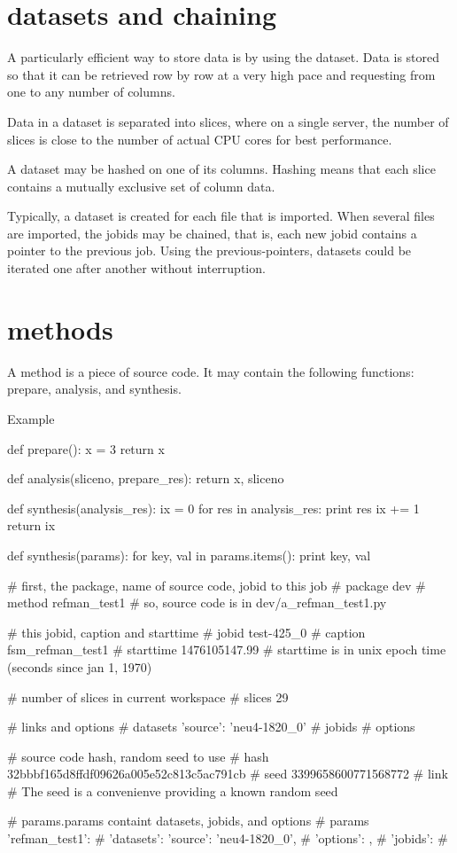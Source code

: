 \section{datasets and chaining}
A particularly efficient way to store data is by using the dataset.
Data is stored so that it can be retrieved row by row at a very high
pace and requesting from one to any number of columns.

Data in a dataset is separated into slices, where on a single server,
the number of slices is close to the number of actual CPU cores for
best performance.

A dataset may be hashed on one of its columns.  Hashing means that
each slice contains a mutually exclusive set of column data.

Typically, a dataset is created for each file that is imported.  When
several files are imported, the jobids may be chained, that is, each
new jobid contains a pointer to the previous job.  Using the
previous-pointers, datasets could be iterated one after another
without interruption.



\section{methods}
A method is a piece of source code.  It may contain the following
functions:  prepare, analysis, and synthesis.

Example

\begin{python}
def prepare():
  x = 3
  return x

def analysis(sliceno, prepare_res):
  return x, sliceno
  
def synthesis(analysis_res):
  ix = 0
  for res in analysis_res:
    print res
    ix += 1
  return ix
\end{python}

\begin{python}
def synthesis(params):
  for key, val in params.items():
    print key, val

# first, the package, name of source code, jobid to this job
#   package   dev
#   method    refman_test1
# so, source code is in dev/a_refman_test1.py

# this jobid, caption and starttime
#   jobid     test-425_0
#   caption   fsm_refman_test1
#   starttime 1476105147.99
# starttime is in unix epoch time (seconds since jan 1, 1970)
    
# number of slices in current workspace
#   slices    29

# links and options
#   datasets  {'source': 'neu4-1820_0'}
#   jobids    {}
#   options   {}

# source code hash, random seed to use    
#   hash      32bbbf165d8ffdf09626a005e52c813c5ac791cb
#   seed      3399658600771568772
#   link      {}
# The seed is a convenienve providing a known random seed

# params.params containt datasets, jobids, and options
#   params    {'refman_test1': {
#                'datasets': {'source': 'neu4-1820_0'},
#                'options': {},
#                'jobids': {}}
#             }
\end{python}


